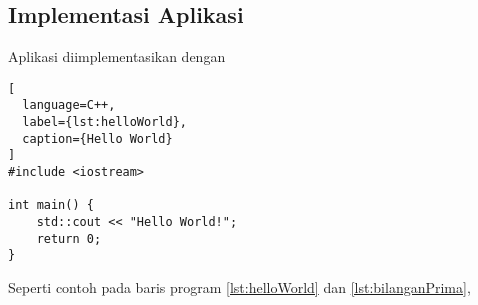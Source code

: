 \lipsum[4]
\vspace{0.5ex}

\subsection{Implementasi Aplikasi}
\vspace{1ex}

Aplikasi diimplementasikan dengan \lipsum[2]
\vspace{0.5ex}

\newpage

\begin{lstlisting}[
  language=C++,
  label={lst:helloWorld},
  caption={Hello World}
]
#include <iostream>

int main() {
    std::cout << "Hello World!";
    return 0;
}
\end{lstlisting}
\vspace{0.5ex}

Seperti contoh pada baris program \ref{lst:helloWorld} dan \ref{lst:bilanganPrima}, \lipsum[3]
\vspace{0.5ex}


\vspace{0.5ex}